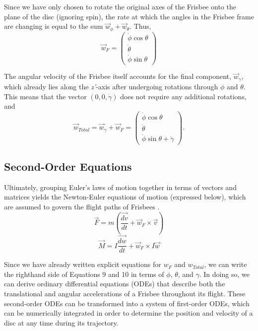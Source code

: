 \documentclass[a4paper,12pt, oneside]{article}
\begin{document}
Since we have only chosen to rotate the original axes of the Frisbee onto the plane of the disc (ignoring spin), the rate at which the angles in the Frisbee frame are changing is equal to the sum $\vec{w}_\phi+\vec{w}_\theta$. Thus,
\begin{equation*}
\vec{w}_F=\left(\begin{array}{ccc}\dot\phi\cos\theta\\\dot\theta\\\dot\phi\sin\theta\end{array} \right)
\end{equation*}

The angular velocity of the Frisbee itself accounts for the final component, $\vec{w}_\gamma$, which already lies along the \textit{z'}-axis after undergoing rotations through $\phi$ and $\theta$. This means that the vector $(0, 0, \dot\gamma)$ does not require any additional rotations, and 
\begin{equation*}
\vec{w}_{Total}=\vec{w}_\gamma+\vec{w}_F=\left(\begin{array}{ccc}\dot\phi\cos\theta\\\dot\theta\\\dot\phi\sin\theta+\dot\gamma\end{array} \right).
\end{equation*}

\subsection{Second-Order Equations}

Ultimately, grouping Euler's laws of motion together in terms of vectors and matrices yields the Newton-Euler equations of motion (expressed below), which are assumed to govern the flight paths of Frisbees \cite{H3}. 
\begin{equation}
  \label{eq:newton3}
  \vec{F}=\textit{m}(\dfrac{\vec{dv}}{dt}+\vec{\textit{w}}_F\times\vec{v})
\end{equation}
\begin{equation}
  \label{eq:newton4}
  \vec{M}=I\dfrac{\vec{dw}}{dt}+\vec{\textit{w}}_F\times I \vec{w}
\end{equation}

Since we have already written explicit equations for $\textit{w}_F$ and $\textit{w}_{Total}$, we can write the righthand side of Equations 9 and 10 in terms of $\phi$, $\theta$, and $\gamma$. In doing so, we can derive ordinary differential equations (ODEs) that describe both the translational and angular accelerations of a Frisbee throughout its flight. These second-order ODEs can be transformed into a system of first-order ODEs, which can be numerically integrated in order to determine the position and velocity of a disc at any time during its trajectory. 
\end{document}
